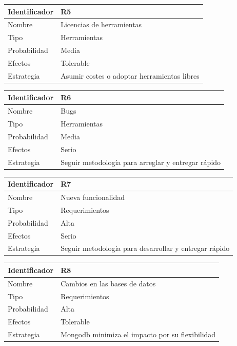 \vspace{1em}
\par
\begin{tabular}{||p{3cm}|p{11cm}||} 
\hline
Identificador & R5 \\ [0.5ex] 
\hline\hline
Nombre & Licencias de herramientas \\ 
\hline
Tipo & Herramientas \\
\hline
Probabilidad & Media \\
\hline
Efectos & Tolerable \\
\hline
Estrategia & Asumir costes o adoptar herramientas libres \\ [1ex] 
\hline
\end{tabular}

\vspace{1em}
\par
\begin{tabular}{||p{3cm}|p{11cm}||} 
\hline
Identificador & R6 \\ [0.5ex] 
\hline\hline
Nombre & Bugs \\ 
\hline
Tipo & Herramientas \\
\hline
Probabilidad & Media \\
\hline
Efectos & Serio \\
\hline
Estrategia & Seguir metodología para arreglar y entregar rápido \\ [1ex] 
\hline
\end{tabular}

\vspace{1em}
\par
\begin{tabular}{||p{3cm}|p{11cm}||} 
\hline
Identificador & R7 \\ [0.5ex] 
\hline\hline
Nombre & Nueva funcionalidad \\ 
\hline
Tipo & Requerimientos \\
\hline
Probabilidad & Alta \\
\hline
Efectos & Serio \\
\hline
Estrategia & Seguir metodología para desarrollar y entregar rápido \\ [1ex] 
\hline
\end{tabular}

\vspace{1em}
\par
\begin{tabular}{||p{3cm}|p{11cm}||} 
\hline
Identificador & R8 \\ [0.5ex] 
\hline\hline
Nombre & Cambios en las bases de datos \\ 
\hline
Tipo & Requerimientos \\
\hline
Probabilidad & Alta \\
\hline
Efectos & Tolerable \\
\hline
Estrategia & Mongodb minimiza el impacto por su flexibilidad \\ [1ex] 
\hline
\end{tabular}

